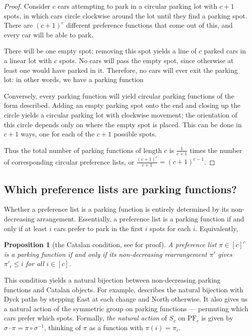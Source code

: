 \documentclass[12 pt]{amsart}
\newtheorem{proposition}[theorem]{Proposition}
\theoremstyle{definition} %
\theoremstyle{remark} %
\begin{document}
\begin{proof}
    Consider $c$ cars attempting to park in a circular parking lot with $c+1$ spots, in which cars circle clockwise around the lot until they find a parking spot. There are $(c+1)^c$ different preference functions that come out of this, and every car will be able to park.

    There will be one empty spot; removing this spot yields a line of $c$ parked cars in a linear lot with $c$ spots. No cars will pass the empty spot, since otherwise at least one would have parked in it. Therefore, no cars will ever exit the parking lot: in other words, we have a parking function
    
    Conversely, every parking function will yield circular parking functions of the form described. Adding an empty parking spot onto the end and closing up the circle yields a circular parking lot with clockwise movement; the orientation of this circle depends only on where the empty spot is placed. This can be done in $c+1$ ways, one for each of the $c+1$ possible spots.

    Thus the total number of parking functions of length $c$ is $\frac{1}{c+1}$ times the number of corresponding circular preference lists, or $\frac{(c+1)^c}{c+1}=(c+1)^{c-1}$.
\end{proof}
	
\subsection{Which preference lists are parking functions?}

Whether a preference list is a parking function is entirely determined by its non-decreasing arrangement. Essentially, a preference list is a parking function if and only if at least $i$ cars prefer to park in the first $i$ spots for each $i$. Equivalently,

\begin{proposition}[the Catalan condition, see \cite{yan-survey-2015} for proof]
	A preference list $\pi \in [c]^{c}$ is a parking function if and only if its non-decreasing rearrangement $\pi'$ gives $\pi'_{i} \le i$ for all $i \in [c]$.
\end{proposition}

This condition yields a natural bijection between non-decreasing parking functions and Catalan objects. For example, \cite{armstrong-loehr-warrington-2016} describes the natural bijection with Dyck paths by stepping East at each change and North otherwise. It also gives us a natural action of the symmetric group on parking functions --- permuting which cars prefer which spots. Formally, \emph{the natural action} of $S_{c}$ on $\mathrm{PF}_{c}$ is given by $\sigma \cdot \pi = \pi \circ \sigma^{-1}$, thinking of $\pi$ as a function with $\pi(i) = \pi_i$. 
\end{document}
